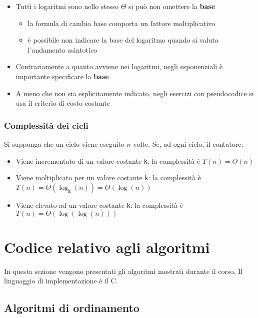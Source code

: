 \documentclass[italian, 10pt]{article}
\begin{document}
\begin{itemize}
  \item Tutti i logaritmi sono nello stesso \(\Theta\) si può non omettere la \textbf{base}
        \begin{itemize}
          \item la formula di cambio base comporta un fattore moltiplicativo
          \item è possibile non indicare la base del logaritmo quando si valuta l'andamento asintotico
        \end{itemize}
  \item Contrariamente a quanto avviene nei logaritmi, negli esponenziali è importante specificare la \textbf{base}
  \item A meno che non sia esplicitamente indicato, negli esercizi con pseudocodice si usa il criterio di costo costante
\end{itemize}

\subsubsection{Complessità dei cicli}

Si supponga che un ciclo viene eseguito \(n\) volte.
Se, ad ogni ciclo, il contatore:

\begin{itemize}
  \item Viene incrementato di un valore costante \texttt{k}: la complessità è \(T(n) = \Theta(n)\)
  \item Viene moltiplicato per un valore costante \texttt{k}: la complessità è \(T(n) = \Theta\left(\log_\texttt{k}{(n)}\right) = \Theta\left(\log{(n)}\right)\)
  \item Viene elevato ad un valore costante \texttt{k}: la complessità è \(T(n) = \Theta\left(\log{\left(\log{(n)}\right)}\right)\)
\end{itemize}

\clearpage

\section{Codice relativo agli algoritmi}

In questa sezione vengono presentati gli algoritmi mostrati durante il corso.
Il linguaggio di implementazione è il C.

\subsection{Algoritmi di ordinamento}


\end{document}
